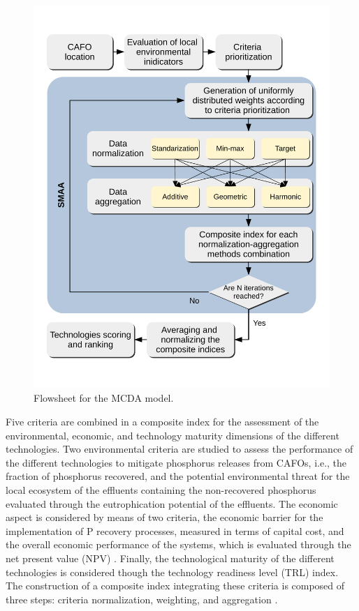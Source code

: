 \begin{refsection}[referencesCh4]
\begin{figure}[h]
	\centering
	\includegraphics[width=0.9\linewidth, trim={0cm 1cm 0cm 1cm},clip]{gfx/Chapter4/MCDA_SMAA.pdf} 
	\caption{Flowsheet for the MCDA model.}
	\label{fig:MCDA_SMAA}
\end{figure}

Five criteria are combined in a composite index for the assessment of the environmental, economic, and technology maturity dimensions of the different technologies. Two environmental criteria are studied to assess the performance of the different technologies to mitigate phosphorus releases from CAFOs, i.e., the fraction of phosphorus recovered, and the potential environmental threat for the local ecosystem of the effluents containing the non-recovered phosphorus evaluated through the eutrophication potential of the effluents. The economic aspect is considered by means of two criteria, the economic barrier for the implementation of P recovery processes, measured in terms of capital cost, and the overall economic performance of the systems, which is evaluated through the net present value (NPV) \citep{sinnott2014chemical}. Finally, the technological maturity of the different technologies is considered though the technology readiness level (TRL) index. The construction of a composite index integrating these criteria is composed of three steps: criteria normalization, weighting, and aggregation \citep{MarcoCinelli2020}.


\end{refsection}
